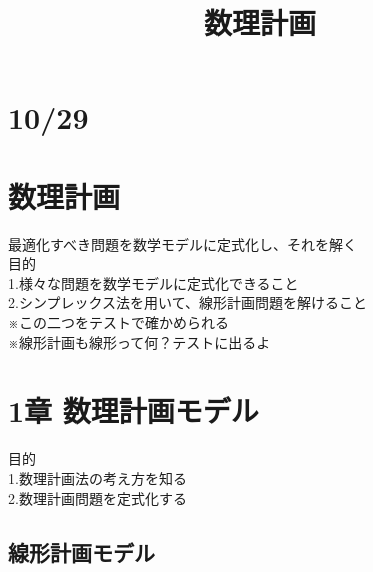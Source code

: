 \documentclass{jsarticle}
\title{数理計画}
\begin{document}
\maketitle

\section{10/29}
\section{数理計画}
	最適化すべき問題を数学モデルに定式化し、それを解く\\
		{\Large{目的}}\\
		1.様々な問題を数学モデルに定式化できること\\
		2.シンプレックス法を用いて、線形計画問題を解けること\\
	※この二つをテストで確かめられる\\
	※線形計画も線形って何？テストに出るよ

\section{1章  数理計画モデル}
{\Large{目的}}\\
	1.数理計画法の考え方を知る\\
	2.数理計画問題を定式化する\\
		\subsection{線形計画モデル}
\end{document}
